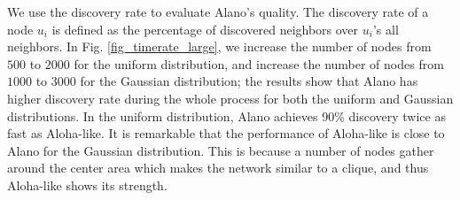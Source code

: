 



We use the discovery rate to evaluate Alano's quality.
The discovery rate of a node $u_i$ is defined as the percentage of discovered neighbors over $u_i$'s all neighbors.
In Fig. \ref{fig_timerate_large}, we increase the number of nodes from
$500$ to $2000$ for the uniform distribution, and increase the number of
nodes from $1000$ to $3000$ for the Gaussian distribution; the results
show that Alano has higher discovery rate during the whole process for
both the uniform and Gaussian distributions. In the uniform distribution,
Alano achieves 90\% discovery twice as fast as Aloha-like. It is
remarkable that the performance of Aloha-like is close to Alano for the
Gaussian distribution. This is because a number of nodes gather around
the center area which makes the network similar to a clique, and thus
Aloha-like shows its strength.





